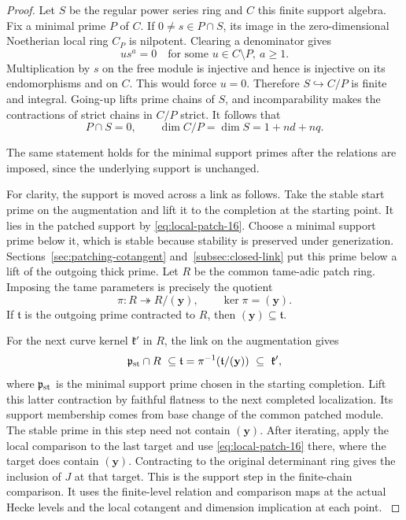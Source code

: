 \begin{proof}
Let \(S\) be the regular power series ring and \(C\) this finite support algebra. Fix a minimal prime \(P\) of \(C\). If \(0\ne s\in P\cap S\), its image in the zero-dimensional Noetherian local ring \(C_P\) is nilpotent. Clearing a denominator gives
\[
               u s^a=0\quad\text{for some }u\in C\setminus P,\ a\ge1 .
\]
Multiplication by \(s\) on the free module is injective and hence is injective on its endomorphisms and on \(C\). This would force \(u=0\). Therefore \(S\hookrightarrow C/P\) is finite and integral. Going-up lifts prime chains of \(S\), and incomparability makes the contractions of strict chains in \(C/P\) strict. It follows that
\[
 P\cap S=0,\qquad \dim C/P=\dim S=1+nd+nq.
\]

The same statement holds for the minimal support
primes after the relations are imposed, since
the underlying support is unchanged.

For clarity, the support is moved across a link
as follows. Take the stable start prime
on the augmentation and lift it to the completion
at the starting point. It lies in the patched
support by \eqref{eq:local-patch-16}. Choose a minimal support prime
below it, which is stable because stability is
preserved under generization. Sections~\ref{sec:patching-cotangent}
and~\ref{subsec:closed-link} put this prime below a lift of the
outgoing thick prime. Let \(R\) be the common tame-adic patch ring. Imposing the tame parameters is precisely the quotient
\[
 \pi:R\twoheadrightarrow R/(\mathbf y),\qquad\ker\pi=(\mathbf y).
\] If \(\mathfrak t\) is the outgoing prime contracted to \(R\), then \((\mathbf y)\subseteq\mathfrak t\).

For the next curve kernel \(\mathfrak k'\) in \(R\), the link on the augmentation gives
\[
  \mathfrak p_{\rm st}\cap R\ \subseteq  \mathfrak t=\pi^{-1}(\mathfrak t/(\mathbf y))\ \subseteq\ \mathfrak k' ,
\]
where \(\mathfrak p_{\rm st}\) is the minimal support prime chosen in the starting completion. Lift this latter
contraction by faithful flatness to the next
completed localization. Its support membership
comes from base change of the common patched
module. The stable prime in this step need not
contain \((\mathbf y)\). After iterating, apply the
local comparison to the last target and use
\eqref{eq:local-patch-16} there, where the target does contain
\((\mathbf y)\). Contracting to the original
determinant ring gives the inclusion of \(J\)
at that target. This is the support step in
the finite-chain comparison. It uses the
finite-level relation and comparison maps at
the actual Hecke levels and the local
cotangent and dimension implication at each
point.
\hfill\mbox{\cite{milne-duality}}\label{cor:ordinary-marked-patching-1}
\end{proof}
